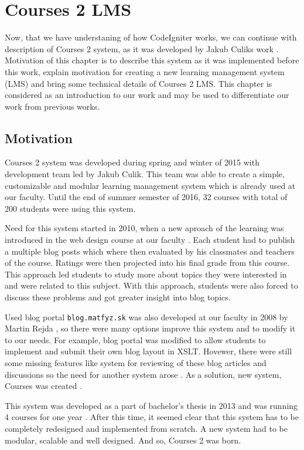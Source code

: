 \chapter{Courses 2 LMS}
\label{sec:courses}


Now, that we have understaning of how CodeIgniter works, we can continue with description of Courses 2 system, as it was developed by Jakub Culiks work \cite{culik}. Motivation of this chapter is to describe this system as it was implemented before this work, explain motivation for creating a new learning management system (LMS) and bring some technical details of Courses 2 LMS. This chapter is considered as an introduction to our work and may be used to differentiate our work from previous works.

\section{Motivation}

Courses 2 system was developed during spring and winter of 2015 with development team led by Jakub Culik. This team was able to create a simple, customizable and modular learning management system which is already used at our faculty. Until the end of summer semester of 2016, 32 courses with total of 200 students were using this system.


Need for this system started in 2010, when a new aproach of the learning was introduced in the web design course at our faculty \cite{culik}. Each student had to publish a multiple blog posts which where then evaluated by his classmates and teachers of the course. Ratings were then projected into his final grade from this course. This approach led students to study more about topics they were interested in and were related to this subject. With this approach, students were also forced to discuss these problems and got greater insight into blog topics.


Used blog portal \texttt{blog.matfyz.sk} was also developed at our faculty in 2008 by Martin Rejda \cite{rejda}, so there were many options improve this system and to modify it to our needs. For example, blog portal was modified to allow students to implement and submit their own blog layout in XSLT. Hovewer, there were still some missing features like system for reviewing of these blog articles and discussions so the need for another system arose \cite{culik}. As a solution, new system, Courses was created \cite{culikbc}.


This system was developed as a part of bachelor's thesis in 2013 \cite{culikbc} and was running 4 courses for one year \cite{culik}. After this time, it seemed clear that this system has to be completely redesigned and implemented from scratch. A new system had to be modular, scalable and well designed. And so, Courses 2 was born.

